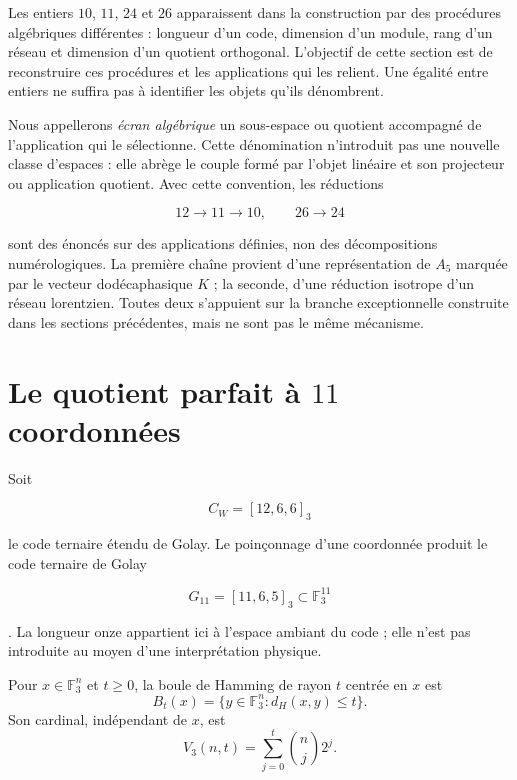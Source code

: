 \label{chap:pantallas-dualidad}

Les entiers \(10\), \(11\), \(24\) et \(26\) apparaissent dans la construction par
des procédures algébriques différentes : longueur d'un code, dimension d'un
module, rang d'un réseau et dimension d'un quotient orthogonal.
L'objectif de cette section est de reconstruire ces procédures et les applications qui
les relient. Une égalité entre entiers ne suffira pas à identifier les
objets qu'ils dénombrent.

Nous appellerons \emph{écran algébrique} un sous-espace ou quotient accompagné
de l'application qui le sélectionne. Cette dénomination n'introduit pas une nouvelle classe
d'espaces : elle abrège le couple formé par l'objet linéaire et son projecteur ou
application quotient. Avec cette convention, les réductions

\[
12\longrightarrow11\longrightarrow10,
\qquad
26\longrightarrow24
\]

sont des énoncés sur des applications définies, non des décompositions numérologiques.
La première chaîne provient d'une représentation de \(A_5\) marquée par le
vecteur dodécaphasique \(K\) ; la seconde, d'une réduction isotrope d'un
réseau lorentzien. Toutes deux s'appuient sur la branche exceptionnelle construite dans
les sections précédentes, mais ne sont pas le même mécanisme.

\section{Le quotient parfait à \(11\) coordonnées}
\label{sec:golay-once}

Soit

\[
C_W=[12,6,6]_3
\]

le code ternaire étendu de Golay. Le poinçonnage d'une coordonnée
produit le code ternaire de Golay

\[
G_{11}=[11,6,5]_3\subset\mathbb F_3^{11}
\]

\cite{MacWilliamsSloane1977}. La longueur onze appartient ici à l'espace
ambiant du code ; elle n'est pas introduite au moyen d'une interprétation physique.

\begin{definition}
Pour \(x\in\mathbb F_3^n\) et \(t\geq0\), la boule de Hamming de rayon \(t\)
centrée en \(x\) est
\[
B_t(x)=\{y\in\mathbb F_3^n:d_H(x,y)\leq t\}.
\]
Son cardinal, indépendant de \(x\), est
\[
V_3(n,t)=\sum_{j=0}^{t}\binom nj2^j.
\]
\end{definition}

